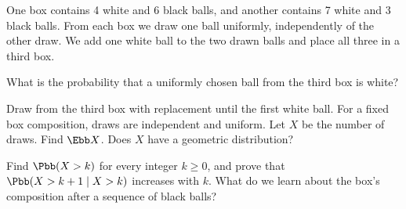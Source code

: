 \begin{problempencil}
One box contains 4 white and 6 black balls, and another contains 7 white and
3 black balls. From each box we draw one ball uniformly, independently of the
other draw. We add one white ball to the two drawn balls and place all three in a third box.
\begin{enumeratea}
  \item What is the probability that a uniformly chosen ball from the third box is white?
  \item Draw from the third box with replacement until the first white ball.
  For a fixed box composition, draws are independent and uniform. Let $X$ be the
  number of draws. Find $\Ebb X$. Does $X$ have a geometric distribution?
  \item Find $\Pbb(X>k)$ for every integer $k\ge0$, and prove that
  $\Pbb(X>k+1\mid X>k)$ increases with $k$. What do we learn about the box's
  composition after a sequence of black balls?
\end{enumeratea}
\end{problempencil}
